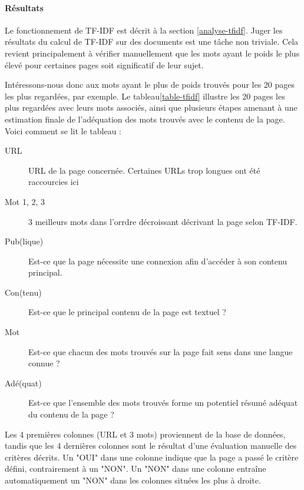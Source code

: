 			\paragraph{Résultats}

				Le fonctionnement de TF-IDF est décrit à la section \ref{analyse-tfidf}. Juger les résultats du calcul de TF-IDF sur des documents est une tâche non triviale. Cela revient principalement à vérifier manuellement que les mots ayant le poids le plus élevé pour certaines pages soit significatif de leur sujet.

				Intéressons-nous donc aux mots ayant le plus de poids trouvés pour les 20 pages les plus regardées, par exemple. Le tableau\ref{table-tfidf} illustre les 20 pages les plus regardées avec leurs mots associés, ainsi que plusieurs étapes amenant à une estimation finale de l'adéquation des mots trouvés avec le contenu de la page. Voici comment se lit le tableau :
				\begin{description}
					\item[URL] URL de la page concernée. Certaines URLs trop longues ont été raccourcies ici
					\item[Mot 1, 2, 3] 3 meilleurs mots dans l'orrdre décroissant décrivant la page selon TF-IDF.
					\item[Pub(lique)] Est-ce que la page nécessite une connexion afin d'accéder à son contenu principal.
					\item[Con(tenu)] Est-ce que le principal contenu de la page est textuel ?
					\item[Mot] Est-ce que chacun des mots trouvés sur la page fait sens dans une langue connue ?
					\item[Adé(quat)] Est-ce que l'ensemble des mots trouvés forme un potentiel résumé adéquat du contenu de la page ?
				\end{description}

				Les 4 premières colonnes (URL et 3 mots) proviennent de la base de données, tandis que les 4 dernières colonnes sont le résultat d'une évaluation manuelle des critères décrits. Un "OUI" dans une colonne indique que la page a passé le critère défini, contrairement à un "NON". Un "NON" dans une colonne entraîne automatiquement un "NON" dans les colonnes situées les plus à droite.

